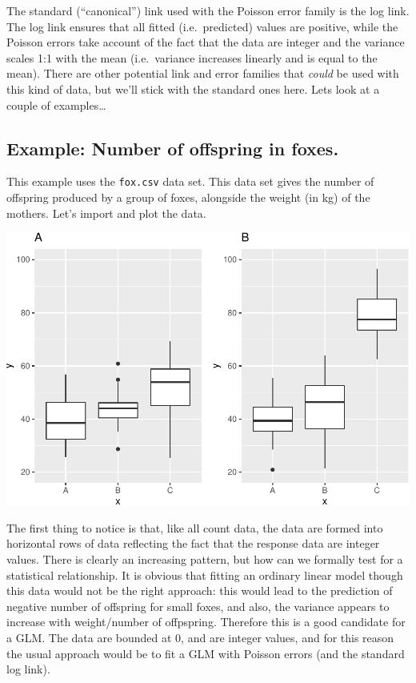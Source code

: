 \documentclass[
  a4paperpaper,
]{book}
\begin{document}
The standard (``canonical'') link used with the Poisson error family is the log link. The log link ensures that all fitted (i.e.~predicted) values are positive, while the Poisson errors take account of the fact that the data are integer and the variance scales 1:1 with the mean (i.e.~variance increases linearly and is equal to the mean). There are other potential link and error families that \emph{could} be used with this kind of data, but we'll stick with the standard ones here. Lets look at a couple of examples\ldots{}

\hypertarget{example-number-of-offspring-in-foxes.}{%
\subsection{Example: Number of offspring in foxes.}\label{example-number-of-offspring-in-foxes.}}

This example uses the \texttt{fox.csv} data set. This data set gives the number of offspring produced by a group of foxes, alongside the weight (in kg) of the mothers. Let's import and plot the data.

\begin{center}\includegraphics{BB852_files/figure-latex/unnamed-chunk-231-1} \end{center}

The first thing to notice is that, like all count data, the data are formed into horizontal rows of data reflecting the fact that the response data are integer values. There is clearly an increasing pattern, but how can we formally test for a statistical relationship. It is obvious that fitting an ordinary linear model though this data would not be the right approach: this would lead to the prediction of negative number of offspring for small foxes, and also, the variance appears to increase with weight/number of offpspring. Therefore this is a good candidate for a GLM. The data are bounded at 0, and are integer values, and for this reason the usual approach would be to fit a GLM with Poisson errors (and the standard log link).
\end{document}
